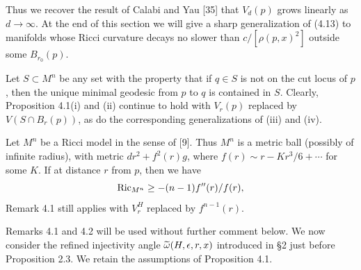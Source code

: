 Thus we recover the result of Calabi and Yau [35] that $V_d(p)$ grows linearly
as $d\to\infty$. At the end of this section we will give a sharp generalization
of (4.13) to manifolds whose Ricci curvature decays no slower than
$c/[\rho(p,x)^2]$ outside some $B_{r_0}(p)$.

\begin{remark}
\label{rem:relative-volume-star-shaped}
Let $S\subset M^n$ be any set with the property that if
$q\in S$ is not on the cut locus of $p$, then the unique minimal geodesic from $p$
to $q$ is contained in $S$. Clearly, Proposition 4.1(i) and (ii) continue to
hold with $V_r(p)$ replaced by $V(S\cap B_r(p))$, as do the corresponding
generalizations of (iii) and (iv).
\end{remark}

\begin{remark}
\label{rem:ricci-models}
Let $M^n$ be a Ricci model in the sense of [9]. Thus $M^n$ is a metric ball
(possibly of infinite radius), with metric $dr^2+f^2(r)g$, where $f(r)\sim
r-Kr^3/6+\cdots$ for some $K$. If at distance $r$ from $p$, then we have
\[
\operatorname{Ric}_{M^n}\ge -(n-1)f''(r)/f(r),
\]
Remark 4.1 still applies with $V_r^H$ replaced by $f^{n-1}(r)$.
\end{remark}

Remarks 4.1 and 4.2 will be used without further comment below.
We now consider the refined injectivity angle $\widetilde{\omega}(H,\epsilon,r,x)$
introduced in \S2 just before Proposition 2.3. We retain the assumptions of
Proposition 4.1.

